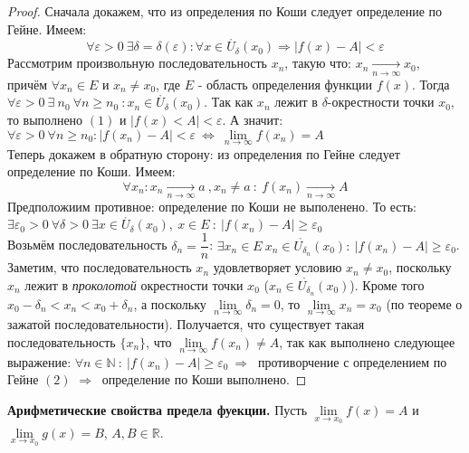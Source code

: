 \documentclass[12pt]{article}
\begin{document}
\begin{proof}
    Сначала докажем, что из определения по Коши следует определение по Гейне. Имеем: 
    \begin{equation}
        \forall \varepsilon > 0 \ \exists \delta = \delta(\varepsilon) : \forall x \in \mathring{U_\delta}(x_0) \Rightarrow |f(x) - A| < \varepsilon
    \end{equation}
    Рассмотрим произвольную последовательность $x_n$, такую что:  $x_n \xrightarrow[n \to \infty]{} x_0$, причём $\forall x_n \in E$ и $x_n \neq x_0$, где $E$ - область определения функции $f(x)$. Тогда $\forall \varepsilon > 0 \ \exists \ n_0 \ \forall n \geq n_0 \ :x_n \in \mathring{U_\delta}(x_0)$. Так как $x_n$ лежит в $\delta$-окрестности точки $x_0$, то выполнено $(1)$ и $|f(x) < A| < \varepsilon$. А значит: $\forall \varepsilon > 0 \ \forall n \geq n_0 : |f(x_n) - A| < \varepsilon \ \Leftrightarrow \ \lim\limits_{n \to \infty} f(x_n) = A $ \\
    Теперь докажем в обратную сторону: из определения по Гейне следует определение по Коши. Имеем:
    \begin{equation}
        \forall {x_n}: x_n \xrightarrow[n \to \infty]{} a \ ,x_n \neq a \ : \ f(x_n) \xrightarrow[n \to \infty]{}A
    \end{equation}
    Предположиим противное: определение по Коши не выполенено. То есть: \\
    $\exists \varepsilon_0 > 0 \ \forall \delta > 0 \ \exists x \in \mathring{U_\delta}(x_0), \ x \in E \ : \ |f(x_n) - A| \geq \varepsilon_0$ \\
    Возьмём последовательность $\delta_n = \dfrac1n$: $\exists x_n \in E \ x_n \in \mathring{U_{\delta_n}}(x_0): \ |f(x_n) - A| \geq \varepsilon_0$. \\
    Заметим, что последовательность $x_n$ удовлетворяет условию $x_n \neq x_0$, поскольку $x_n$ лежит в \textit{проколотой} окрестности точки $x_0$ ($x_n \in \mathring{U_{\delta_n}}(x_0)$). Кроме того $x_0 - \delta_n < x_n < x_0 + \delta_n$, а поскольку $\lim\limits_{n \to \infty} \delta_n = 0$, то $\lim\limits_{n \to \infty} x_n = x_0$ (по теореме о зажатой последовательности). Получается, что существует такая последовательность $\{x_n\}$, что $\lim\limits_{n \to \infty} f(x_n) \neq A$, так как выполнено следующее выражение: $\forall n \in \mathbb{N} \ : \  |f(x_n) - A| \geq \varepsilon_0 \ \Rightarrow \ $ противорчение с определением по Гейне $(2)$ $\Rightarrow \ $ определение по Коши выполнено.
\end{proof}
\textbf{Арифметические свойства предела фуекции.} Пусть $\lim\limits_{x \to x_0} f(x) = A$ и $\lim\limits_{x \to x_0} g(x) = B$, $A, B \in \mathbb{R}$.
\end{document}
